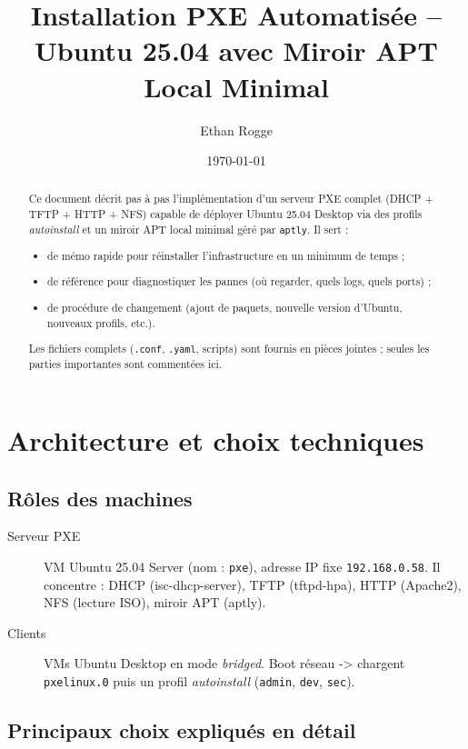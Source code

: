 \documentclass[a4paper,12pt]{article}
\title{Installation PXE Automatisée – Ubuntu 25.04 avec Miroir APT Local Minimal}
\author{Ethan Rogge}
\date{\today}
\begin{document}
\maketitle

\begin{abstract}
Ce document décrit pas à pas l’implémentation d’un serveur PXE complet (DHCP + TFTP + HTTP + NFS) capable de déployer Ubuntu 25.04 Desktop via des profils \emph{autoinstall} et un miroir APT local minimal géré par \texttt{aptly}. Il sert :
\begin{itemize}
\item de mémo rapide pour réinstaller l’infrastructure en un minimum de temps ;
\item de référence pour diagnostiquer les pannes (où regarder, quels logs, quels ports) ;
\item de procédure de changement (ajout de paquets, nouvelle version d’Ubuntu, nouveaux profils, etc.).
\end{itemize}
Les fichiers complets (\texttt{.conf}, \texttt{.yaml}, scripts) sont fournis en pièces jointes ; seules les parties importantes sont commentées ici.
\end{abstract}

\section{Architecture et choix techniques}
\subsection{Rôles des machines}
\begin{description}
\item[Serveur PXE] VM Ubuntu 25.04 Server (nom : \texttt{pxe}), adresse IP fixe \texttt{192.168.0.58}. Il concentre :
DHCP (isc-dhcp-server), TFTP (tftpd-hpa), HTTP (Apache2), NFS (lecture ISO), miroir APT (aptly).
\item[Clients] VMs Ubuntu Desktop en mode \emph{bridged}. Boot réseau -> chargent \texttt{pxelinux.0} puis un profil \textit{autoinstall} (\texttt{admin}, \texttt{dev}, \texttt{sec}).
\end{description}

\subsection{Principaux choix expliqués en détail}
\end{document}
